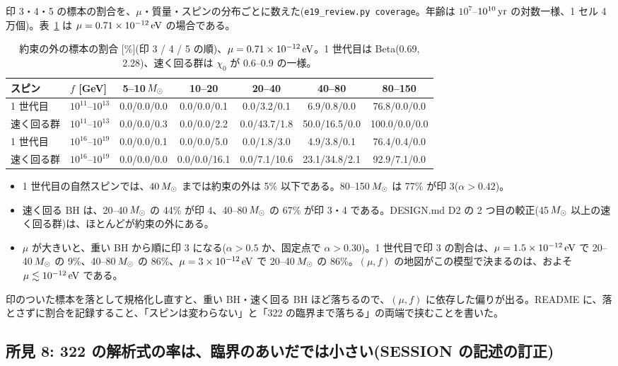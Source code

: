 印 3・4・5 の標本の割合を、$\mu$・質量・スピンの分布ごとに数えた(\texttt{e19\_review.py coverage}。年齢は $10^7$--$10^{10}\,\mathrm{yr}$ の対数一様、1 セル 4 万個)。表~\ref{tab:e19cov} は $\mu=0.71\times10^{-12}\,\mathrm{eV}$ の場合である。
\begin{table}[H]
\centering\small
\begin{tabular}{llccccc}
\toprule
スピン & $f$ [GeV] & 5--10$\,M_\odot$ & 10--20 & 20--40 & 40--80 & 80--150\\
\midrule
1 世代目 & $10^{11}$--$10^{13}$ & 0.0/0.0/0.0 & 0.0/0.0/0.1 & 0.0/3.2/0.1 & 6.9/0.8/0.0 & 76.8/0.0/0.0\\
速く回る群 & $10^{11}$--$10^{13}$ & 0.0/0.0/0.3 & 0.0/0.0/2.2 & 0.0/43.7/1.8 & 50.0/16.5/0.0 & 100.0/0.0/0.0\\
1 世代目 & $10^{16}$--$10^{19}$ & 0.0/0.0/0.1 & 0.0/0.0/5.0 & 0.0/1.8/3.0 & 4.9/3.8/0.1 & 76.4/0.4/0.0\\
速く回る群 & $10^{16}$--$10^{19}$ & 0.0/0.0/0.0 & 0.0/0.0/16.1 & 0.0/7.1/10.6 & 23.1/34.8/2.1 & 92.9/7.1/0.0\\
\bottomrule
\end{tabular}
\caption{約束の外の標本の割合 [\%](印 3 / 4 / 5 の順)、$\mu=0.71\times10^{-12}\,\mathrm{eV}$。1 世代目は Beta(0.69, 2.28)、速く回る群は $\chi_0$ が 0.6--0.9 の一様。}
\label{tab:e19cov}
\end{table}
\begin{itemize}
\item 1 世代目の自然スピンでは、$40\,M_\odot$ までは約束の外は 5\% 以下である。80--150$\,M_\odot$ は 77\% が印 3($\alpha>0.42$)。
\item 速く回る BH は、20--40$\,M_\odot$ の 44\% が印 4、40--80$\,M_\odot$ の 67\% が印 3・4 である。DESIGN.md D2 の 2 つ目の較正(45$\,M_\odot$ 以上の速く回る群)は、ほとんどが約束の外にある。
\item $\mu$ が大きいと、重い BH から順に印 3 になる($\alpha>0.5$ か、固定点で $\alpha>0.30$)。1 世代目で印 3 の割合は、$\mu=1.5\times10^{-12}\,\mathrm{eV}$ で 20--40$\,M_\odot$ の 9\%、40--80$\,M_\odot$ の 86\%、$\mu=3\times10^{-12}\,\mathrm{eV}$ で 20--40$\,M_\odot$ の 86\%。$(\mu,f)$ の地図がこの模型で決まるのは、およそ $\mu\lesssim10^{-12}\,\mathrm{eV}$ である。
\end{itemize}
印のついた標本を落として規格化し直すと、重い BH・速く回る BH ほど落ちるので、$(\mu,f)$ に依存した偏りが出る。README に、落とさずに割合を記録すること、「スピンは変わらない」と「322 の臨界まで落ちる」の両端で挟むことを書いた。

\subsection{所見 8: 322 の解析式の率は、臨界のあいだでは小さい(SESSION の記述の訂正)}

